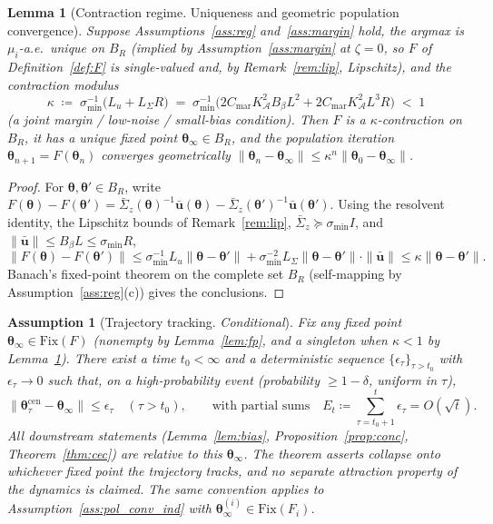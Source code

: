 \documentclass[11pt]{article}
\newtheorem{lemma}[theorem]{Lemma}
\newtheorem{assumption}[theorem]{Assumption}
\begin{document}
\begin{lemma}[Contraction regime. Uniqueness and geometric
population convergence]\label{lem:contraction}
Suppose Assumptions~\ref{ass:reg} and~\ref{ass:margin} hold, the
argmax is $\mu_i$-a.e.\ unique on $B_R$ (implied by
Assumption~\ref{ass:margin} at $\zeta=0$, so $F$ of
Definition~\ref{def:F} is single-valued and, by
Remark~\ref{rem:lip}, Lipschitz), and the contraction modulus
\begin{equation}
\kappa\;\coloneqq\;\sigma_{\min}^{-1}\bigl(L_u+L_\Sigma R\bigr)
\;=\;\sigma_{\min}^{-1}\bigl(2C_{\mathrm{mar}}K_{\mathcal{A}}^2 B_\beta L^2
+2C_{\mathrm{mar}}K_{\mathcal{A}}^2 L^3 R\bigr)\;<\;1
\label{eq:kappa}
\end{equation}
(a joint margin / low-noise / small-bias condition).  Then $F$ is a
$\kappa$-contraction on $B_R$, it has a \emph{unique} fixed point
$\bm{\theta}_\infty\in B_R$, and the population iteration
$\bm{\theta}_{n+1}=F(\bm{\theta}_n)$ converges geometrically $\|\bm{\theta}_n-\bm{\theta}_\infty\|\leq\kappa^n\|\bm{\theta}_0-\bm{\theta}_\infty\|$.
\end{lemma}

\begin{proof}
For $\bm{\theta},\bm{\theta}'\in B_R$, write
$F(\bm{\theta})-F(\bm{\theta}')
=\bar{\Sigma}_z(\bm{\theta})^{-1}\bar{\bm{u}}(\bm{\theta})
-\bar{\Sigma}_z(\bm{\theta}')^{-1}\bar{\bm{u}}(\bm{\theta}')$.
Using the resolvent identity, the Lipschitz bounds of
Remark~\ref{rem:lip},
$\bar{\Sigma}_z\succeq\sigma_{\min}I$, and
$\|\bar{\bm{u}}\|\leq B_\beta L\leq\sigma_{\min}R$,
\[
\|F(\bm{\theta})-F(\bm{\theta}')\|
\leq\sigma_{\min}^{-1}L_u\|\bm{\theta}-\bm{\theta}'\|
+\sigma_{\min}^{-2}L_\Sigma\|\bm{\theta}-\bm{\theta}'\|\cdot\|\bar{\bm{u}}\|
\leq\kappa\|\bm{\theta}-\bm{\theta}'\|.
\]
Banach's fixed-point theorem on the complete set $B_R$ (self-mapping by
Assumption~\ref{ass:reg}(c)) gives the conclusions.
\end{proof}

\begin{assumption}[Trajectory tracking. \emph{Conditional}]\label{ass:pol_conv}
Fix any fixed point $\bm\theta_\infty\in\mathrm{Fix}(F)$
(nonempty by Lemma~\ref{lem:fp}, and a singleton when $\kappa<1$ by
Lemma~\ref{lem:contraction}).
There exist a time $t_0<\infty$ and a deterministic sequence
$\{\epsilon_\tau\}_{\tau>t_0}$ with $\epsilon_\tau\to 0$ such that, on a
high-probability event (probability $\geq 1-\delta$, uniform in $\tau$),
\[
\|\bm{\theta}_\tau^{\mathrm{cen}}-\bm{\theta}_\infty\|\leq\epsilon_\tau
\quad(\tau>t_0),
\qquad\text{with partial sums}\quad
E_t\coloneqq\sum_{\tau=t_0+1}^t\epsilon_\tau=O(\sqrt{t}).
\]
All downstream statements (Lemma~\ref{lem:bias},
Proposition~\ref{prop:conc}, Theorem~\ref{thm:cec}) are relative to
\emph{this} $\bm\theta_\infty$. The theorem asserts collapse onto
whichever fixed point the trajectory tracks, and no separate
attraction property of the dynamics is claimed.  The same convention
applies to Assumption~\ref{ass:pol_conv_ind} with
$\bm\theta_\infty^{(i)}\in\mathrm{Fix}(F_i)$.
\end{assumption}
\end{document}
